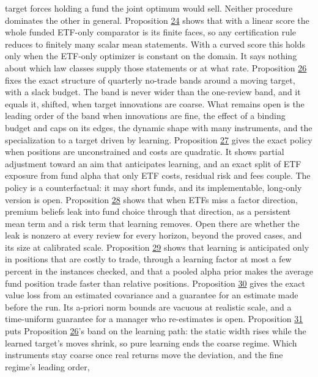 \documentclass[11pt]{article}
\begin{document}
target forces holding a fund the joint optimum would sell. Neither
procedure dominates the other in general.
Proposition \hyperref[res:Proposition-24]{24} shows that with a linear score the whole funded
ETF-only comparator is its finite faces, so any certification rule
reduces to finitely many scalar mean statements. With a curved score
this holds only when the ETF-only optimizer is constant on the
domain. It says nothing about which law classes supply those
statements or at what rate.
Proposition \hyperref[res:Proposition-26]{26} fixes the exact structure of quarterly no-trade bands
around a moving target, with a slack budget. The band is never wider
than the one-review band, and it equals it, shifted, when target
innovations are coarse. What remains open is the leading order of
the band when innovations are fine, the effect of a binding budget
and caps on its edges, the dynamic shape with many instruments, and
the specialization to a target driven by learning.
Proposition \hyperref[res:Proposition-27]{27} gives the exact policy when positions are
unconstrained and costs are quadratic. It shows partial adjustment
toward an aim that anticipates learning, and an exact split of ETF
exposure from fund alpha that only ETF costs, residual risk and fees
couple. The policy is a counterfactual: it may short funds, and its
implementable, long-only version is open.
Proposition \hyperref[res:Proposition-28]{28} shows that when ETFs miss a factor direction, premium
beliefs leak into fund choice through that direction, as a
persistent mean term and a risk term that learning removes. Open
there are whether the leak is nonzero at every review for every
horizon, beyond the proved cases, and its size at calibrated scale.
Proposition \hyperref[res:Proposition-29]{29} shows that learning is anticipated only in positions
that are costly to trade, through a learning factor at most a few
percent in the instances checked, and that a pooled alpha prior makes
the average fund position trade faster than relative positions.
Proposition \hyperref[res:Proposition-30]{30} gives the exact value loss from an estimated covariance
and a guarantee for an estimate made before the run. Its a-priori norm
bounds are vacuous at realistic scale, and a time-uniform guarantee
for a manager who re-estimates is open.
Proposition \hyperref[res:Proposition-31]{31} puts Proposition \hyperref[res:Proposition-26]{26}'s band on the learning path: the
static width rises while the learned target's moves shrink, so pure
learning ends the coarse regime. Which instruments stay coarse once
real returns move the deviation, and the fine regime's leading order,
\end{document}
